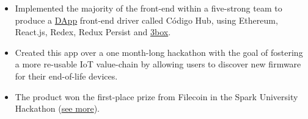 \documentclass[8pt,a4paper]{altacv}
\begin{document}
\begin{itemize}
\item Implemented the majority of the front-end within a five-strong team to produce a \href{https://ethereum.org/en/developers/docs/dapps/#definition-of-a-dapp}{DApp} front-end driver called Código Hub, using Ethereum, React.js, Redex, Redux Persist and \href{https://3boxlabs.com/}{3box}. 
\item Created this app over a one month-long hackathon with the goal of fostering a more re-usable IoT value-chain by allowing users to discover new firmware for their end-of-life devices.
\item The product won the first-place prize from Filecoin in the Spark University Hackathon (\href{https://www.ed.ac.uk/informatics/news-events/stories/2020/undergraduate-students-win-filecoin-challenge}{see more}).
\end{itemize}
\end{document}
